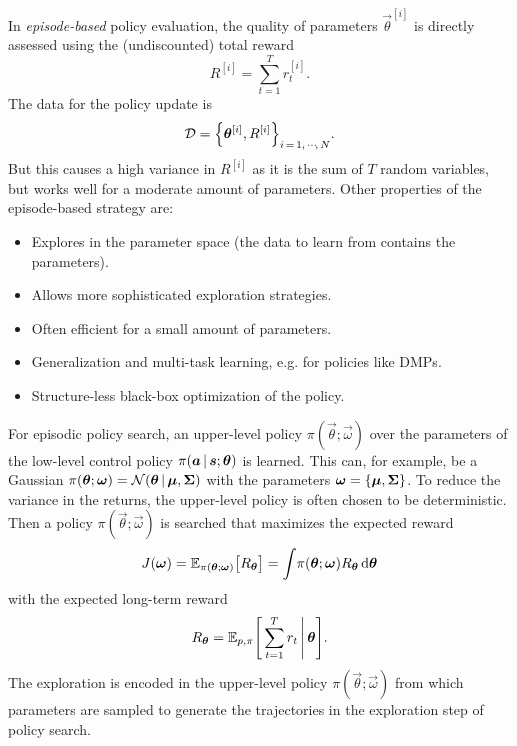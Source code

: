 			In \emph{episode-based} policy evaluation, the quality of parameters \( \vec{\theta}^{[i]} \) is directly assessed using the (undiscounted) total reward
			\begin{equation*}
				R^{[i]} = \sum_{t = 1}^{T} r_t^{[i]}.
			\end{equation*}
			The data for the policy update is
			\begin{equation*}
				\mathcal{D} = \Big\{ \bm{\theta}^{[i]}, R^{[i]} \Big\}_{i \,=\, 1,\,\cdots\!,\,N}.
			\end{equation*}
			But this causes a high variance in \( R^{[i]} \) as it is the sum of \(T\) random variables, but works well for a moderate amount of parameters. Other properties of the episode-based strategy are:
			\begin{itemize}
				\item Explores in the parameter space (the data to learn from contains the parameters).
				\item Allows more sophisticated exploration strategies.
				\item Often efficient for a small amount of parameters.
				\item Generalization and multi-task learning, e.g. for policies like DMPs.
				\item Structure-less black-box optimization of the policy.
			\end{itemize}

			For episodic policy search, an upper-level policy \( \pi(\vec{\theta}; \vec{\omega}) \) over the parameters of the low-level control policy \( \pi(\bm{a} \,\vert\, \bm{s}; \bm{\theta}) \) is learned. This can, for example, be a Gaussian \( \pi(\bm{\theta}; \bm{\omega}) = \mathcal{N}(\bm{\theta} \,\vert\, \bm{\mu}, \bm{\Sigma}) \) with the parameters \( \bm{\omega} = \{ \bm{\mu}, \bm{\Sigma} \} \). To reduce the variance in the returns, the upper-level policy is often chosen to be deterministic. Then a policy \( \pi(\vec{\theta}; \vec{\omega}) \) is searched that maximizes the expected reward
			\begin{equation}
				J(\bm{\omega})
				= \mathbb{E}_{\pi(\bm{\theta}; \bm{\omega})}\big[ R_{\bm{\theta}} \big]
				= \int\! \pi(\bm{\theta}; \bm{\omega}) R_{\bm{\theta}} \dd{\bm{\theta}}  \label{eq:upperLevelReward}
			\end{equation}
			with the expected long-term reward
			\begin{equation*}
				R_{\bm{\theta}} = \mathbb{E}_{p, \pi}\Bigg[ \sum_{t = 1}^{T} r_t \,\Bigg\vert\, \bm{\theta} \Bigg].
			\end{equation*}
			The exploration is encoded in the upper-level policy \( \pi(\vec{\theta}; \vec{\omega}) \) from which parameters are sampled to generate the trajectories in the exploration step of policy search.

